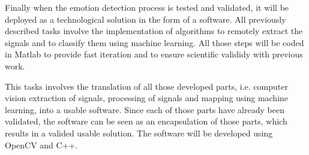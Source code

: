 Finally when the emotion detection process is tested and validated, it will be deployed as a technological solution in the form of a software. All previously described tasks involve the implementation of algorithms to remotely extract the signals and to classify them using machine learning. All those steps will be coded in Matlab to provide fast iteration and to ensure scientific valididy with previous work.

This tasks involves the translation of all those developed parts, i.e. computer vision extraction of signals, processing of signals and mapping using machine learning, into a usable software. Since each of those parts have already been validated, the software can be seen as an encapsulation of those parts, which results in a valided usable solution. The software will be developed using OpenCV and C++.


